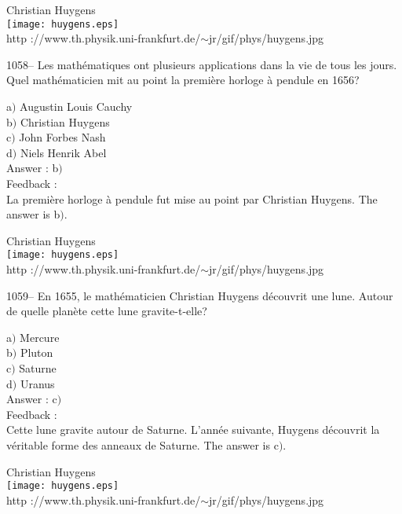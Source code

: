 \documentclass[letterpaper, 12pt]{article}
\begin{document}
        \begin{center}
        Christian Huygens\\
    \texttt{[image: huygens.eps]}\\
        {\footnotesize http
://www.th.physik.uni-frankfurt.de/$\sim$jr/gif/phys/huygens.jpg}
    \end{center}

1058-- Les math\'ematiques ont plusieurs applications dans la vie de
tous les jours. Quel math\'ematicien mit au point la premi\`ere
horloge \`a pendule en 1656?

a$)$ Augustin Louis Cauchy \\
b$)$ Christian Huygens  \\
c$)$ John Forbes Nash  \\
d$)$ Niels Henrik Abel \\

Answer : b$)$\\

Feedback : \\
La premi\`ere horloge \`a pendule fut mise au point par Christian
Huygens.
The answer is b$)$.\\

        \begin{center}
        Christian Huygens\\
    \texttt{[image: huygens.eps]}\\
        {\footnotesize http
://www.th.physik.uni-frankfurt.de/$\sim$jr/gif/phys/huygens.jpg}
    \end{center}

1059-- En 1655, le math\'ematicien Christian Huygens d\'ecouvrit une
lune. Autour de quelle plan\`ete cette lune gravite-t-elle?

a$)$ Mercure \\
b$)$ Pluton  \\
c$)$ Saturne  \\
d$)$ Uranus \\

Answer : c$)$\\

Feedback : \\
Cette lune gravite autour de Saturne. L'ann\'ee suivante, Huygens
d\'ecouvrit la v\'eritable forme des anneaux de Saturne.
The answer is c$)$.\\

        \begin{center}
        Christian Huygens\\
    \texttt{[image: huygens.eps]}\\
        {\footnotesize http
://www.th.physik.uni-frankfurt.de/$\sim$jr/gif/phys/huygens.jpg}
    \end{center}
\end{document}
